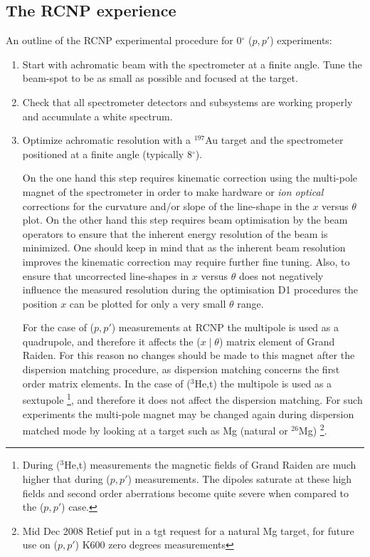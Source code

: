 \documentclass[11pt]{report}
\begin{document}
\subsection{The RCNP experience}
An outline of the RCNP experimental procedure for 0$^{\circ}$ ($p,p'$) experiments:
\begin{enumerate}
\item Start with achromatic beam with the spectrometer at a finite angle. 
      Tune the beam-spot to be as small as possible and focused at the target.
\item Check that all spectrometer detectors and subsystems are working properly and accumulate a white spectrum.
\item Optimize achromatic resolution with a $^{197}$Au target and the 
      spectrometer positioned at a finite angle (typically 8$^{\circ}$).

      On the one hand this step requires kinematic correction using the multi-pole magnet 
      of the spectrometer in order to make hardware or {\it ion optical} corrections for the curvature
      and/or slope of the line-shape in the $x$ versus $\theta$ plot.
      On the other hand this step requires beam optimisation by the beam operators
      to ensure that the inherent energy resolution of the beam is minimized.
      One should keep in mind that as the inherent beam resolution improves
      the kinematic correction may require further fine tuning.
      Also, to ensure that uncorrected line-shapes in  $x$ versus $\theta$ does not
      negatively influence the measured resolution
      during the optimisation D1
procedures the position $x$ can be plotted for 
      only a very small $\theta$ range.



      For the case of ($p,p'$) measurements at RCNP the multipole is used as a quadrupole, and
      therefore it affects the ($x\mid\theta$) matrix element of Grand Raiden. For this
      reason no changes should be made to this magnet after the dispersion matching procedure, as
      dispersion matching concerns the first order matrix elements. In the case
      of (${^3}$He,t) the multipole is used as a sextupole \footnote{During
      (${^3}$He,t) measurements the magnetic fields of Grand Raiden are much higher that during ($p,p'$)
      measurements. The dipoles saturate at these high fields and second order aberrations 
      become quite severe when compared to the ($p,p'$) case.}, and therefore it does not affect
      the dispersion matching. For such experiments the  multi-pole magnet 
      may be changed again during dispersion matched mode by looking at a target such
      as Mg (natural or $^{26}$Mg) \footnote{Mid Dec 2008 Retief put in a tgt request for a natural Mg target,
      for future use on ($p,p'$) K600 zero degrees measurements}.


\end{enumerate}
\end{document}
